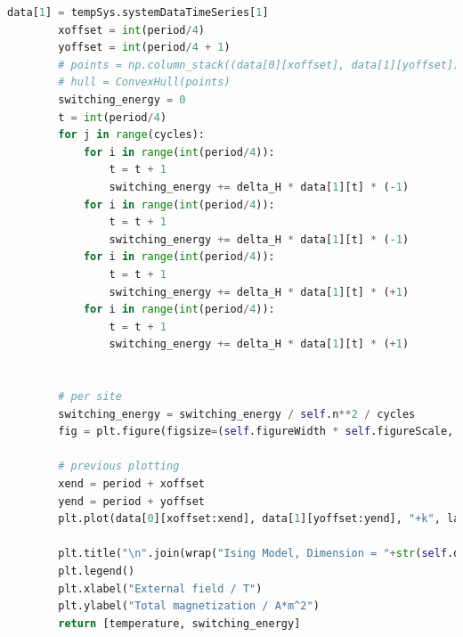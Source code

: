 \documentclass[%
showkeys,
bibnotes,
amsmath,amssymb,
floatfix,
]{revtex4-1}
\begin{document}
\begin{lstlisting}[language=Python]
        data[1] = tempSys.systemDataTimeSeries[1]
        xoffset = int(period/4)
        yoffset = int(period/4 + 1)
        # points = np.column_stack((data[0][xoffset], data[1][yoffset]))
        # hull = ConvexHull(points)
        switching_energy = 0
        t = int(period/4)
        for j in range(cycles): 
            for i in range(int(period/4)):
                t = t + 1
                switching_energy += delta_H * data[1][t] * (-1)
            for i in range(int(period/4)):
                t = t + 1
                switching_energy += delta_H * data[1][t] * (-1)
            for i in range(int(period/4)):
                t = t + 1
                switching_energy += delta_H * data[1][t] * (+1)
            for i in range(int(period/4)):
                t = t + 1
                switching_energy += delta_H * data[1][t] * (+1)


        # per site
        switching_energy = switching_energy / self.n**2 / cycles
        fig = plt.figure(figsize=(self.figureWidth * self.figureScale, self.figureHeight * self.figureScale), dpi=self.figureDpi)

        # previous plotting
        xend = period + xoffset
        yend = period + yoffset
        plt.plot(data[0][xoffset:xend], data[1][yoffset:yend], "+k", label = "dissipation energy per site = " + str(sigfig.round(float(switching_energy), sigfigs=2)) + "T * A * m**2")

        plt.title("\n".join(wrap("Ising Model, Dimension = "+str(self.d)+", N = "+str(self.n)+", Tc = "+str(sigfig.round(float(self.tc), sigfigs=4))+"K, T = "+str(sigfig.round(float(temperature), sigfigs=4)) + "K, period = "+str(self.steps)+"au" + ", dH/dt = "+str(delta_H)+"T/au", 60)))
        plt.legend()
        plt.xlabel("External field / T")
        plt.ylabel("Total magnetization / A*m^2")
        return [temperature, switching_energy]
\end{lstlisting}



%


\end{document}
